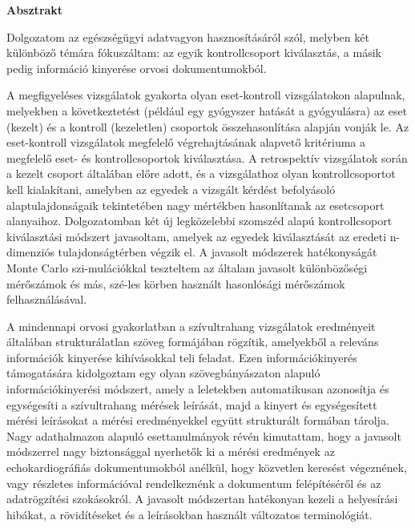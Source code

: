 \centerline{\Large{\textbf{Absztrakt}}}

\vspace{0.5cm}

\noindent Dolgozatom az egészségügyi adatvagyon hasznosításáról szól, melyben két különböző témára fókuszáltam: az egyik kontrollcsoport kiválasztás, a másik pedig információ kinyerése orvosi dokumentumokból. 

A megfigyeléses vizsgálatok gyakorta olyan eset-kontroll vizsgálatokon alapulnak, melyekben a következtetést (például egy gyógyszer hatását a gyógyulásra) az eset (kezelt) és a kontroll (kezeletlen) csoportok összehasonlítása alapján vonják le. Az eset-kontroll vizsgálatok megfelelő végrehajtásának alapvető kritériuma a megfelelő eset- és kontrollcsoportok kiválasztása. A retrospektív vizsgálatok során a kezelt csoport általában előre adott, és a vizsgálathoz olyan kontrollcsoportot kell kialakítani, amelyben az egyedek a vizsgált kérdést befolyásoló alaptulajdonságaik tekintetében nagy mértékben hasonlítanak az esetcsoport alanyaihoz. Dolgozatomban két új legközelebbi szomszéd alapú kontrollcsoport kiválasztási módszert javasoltam, amelyek az egyedek kiválasztását az eredeti n-dimenziós tulajdonságtérben végzik el. A javasolt módszerek hatékonyságát Monte Carlo szi-mulációkkal teszteltem az általam javasolt különbözőségi mérőszámok és más, szé-les körben használt hasonlósági mérőszámok felhasználásával. 

A mindennapi orvosi gyakorlatban a szívultrahang vizsgálatok eredményeit általában strukturálatlan szöveg formájában rögzítik, amelyekből a releváns információk kinyerése kihívásokkal teli feladat. Ezen információkinyerés támogatására kidolgoztam egy olyan szövegbányászaton alapuló információkinyerési módszert, amely a leletekben automatikusan azonosítja és egységesíti a szívultrahang mérések leírását, majd a kinyert és egységesített mérési leírásokat a mérési eredményekkel együtt strukturált formában tárolja. Nagy adathalmazon alapuló esettanulmányok révén kimutattam, hogy a javasolt módszerrel nagy biztonsággal nyerhetők ki a mérési eredmények az echokardiográfiás dokumentumokból anélkül, hogy közvetlen keresést végeznének, vagy részletes információval rendelkeznénk a dokumentum felépítéséről és az adatrögzítési szokásokról. A javasolt módszertan hatékonyan kezeli a helyesírási hibákat, a rövidítéseket és a leírásokban használt változatos terminológiát.